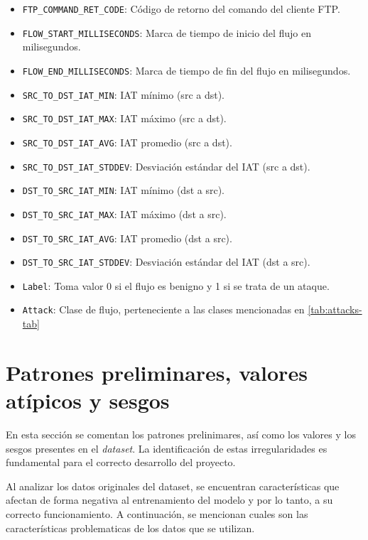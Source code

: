 \begin{itemize}
    \item \texttt{FTP\_COMMAND\_RET\_CODE}: Código de retorno del comando del cliente FTP.
    \item \texttt{FLOW\_START\_MILLISECONDS}: Marca de tiempo de inicio del flujo en milisegundos.
    \item \texttt{FLOW\_END\_MILLISECONDS}: Marca de tiempo de fin del flujo en milisegundos.
    \item \texttt{SRC\_TO\_DST\_IAT\_MIN}: IAT mínimo (src a dst).
    \item \texttt{SRC\_TO\_DST\_IAT\_MAX}: IAT máximo (src a dst).
    \item \texttt{SRC\_TO\_DST\_IAT\_AVG}: IAT promedio (src a dst).
    \item \texttt{SRC\_TO\_DST\_IAT\_STDDEV}: Desviación estándar del IAT (src a dst).
    \item \texttt{DST\_TO\_SRC\_IAT\_MIN}: IAT mínimo (dst a src).
    \item \texttt{DST\_TO\_SRC\_IAT\_MAX}: IAT máximo (dst a src).
    \item \texttt{DST\_TO\_SRC\_IAT\_AVG}: IAT promedio (dst a src).
    \item \texttt{DST\_TO\_SRC\_IAT\_STDDEV}: Desviación estándar del IAT (dst a src).
    \item \texttt{Label}: Toma valor 0 si el flujo es benigno y 1 si se trata de un ataque.
    \item \texttt{Attack}: Clase de flujo, perteneciente a las clases mencionadas en \ref{tab:attacks-tab} 
\end{itemize}

\section{Patrones preliminares, valores atípicos y sesgos} \label{sec.segos-datos}
En esta sección se comentan los patrones prelinimares, así como los valores y los sesgos presentes en el \textit{dataset}. La identificación de estas irregularidades es fundamental para el correcto desarrollo del proyecto.

Al analizar los datos originales del dataset, se encuentran características que afectan de forma negativa al entrenamiento del modelo y por lo tanto, a su correcto funcionamiento. A continuación, se mencionan cuales son las características problematicas de los datos que se utilizan.


